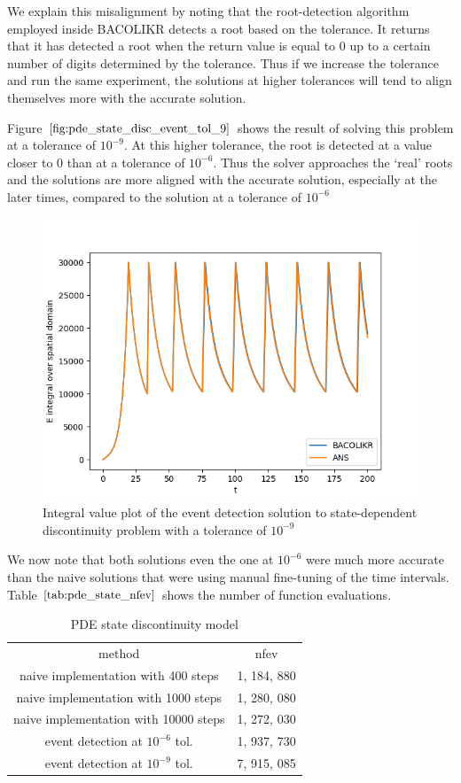 \documentclass{article}
\begin{document}
We explain this misalignment by noting that the root-detection algorithm employed inside BACOLIKR detects a root based on the tolerance. It returns that it has detected a root when the return value is equal to 0 up to a certain number of digits determined by the tolerance. Thus if we increase the tolerance and run the same experiment, the solutions at higher tolerances will tend to align themselves more with the accurate solution.

Figure $\ref{fig:pde_state_disc_event_tol_9}$ shows the result of solving this problem at a tolerance of $10^{-9}$. At this higher tolerance, the root is detected at a value closer to 0 than at a tolerance of $10^{-6}$. Thus the solver approaches the `real' roots and the solutions are more aligned with the accurate solution, especially at the later times, compared to the solution at a tolerance of $10^{-6}$


\begin{figure}[H]
\centering
\includegraphics[width=0.7\linewidth]{./figures/pde_state_disc_event_tol_9}
\caption{Integral value plot of the event detection solution to state-dependent discontinuity problem with a tolerance of $10^{-9}$}
\label{fig:pde_state_disc_event_tol_9}
\end{figure}

We now note that both solutions even the one at $10^{-6}$ were much more accurate than the naive solutions that were using manual fine-tuning of the time intervals. Table $\ref{tab:pde_state_nfev}$ shows the number of function evaluations. 

\begin{table}[h]
\caption {PDE state discontinuity model} 
\label{tab:pde_state_nfev}
\begin{center}
\begin{tabular}{ c c } 
method & nfev \\ 
naive implementation with 400 steps   & 1, 184, 880 \\
naive implementation with 1000 steps  & 1, 280, 080 \\
naive implementation with 10000 steps & 1, 272, 030 \\
event detection at $10^{-6}$ tol.     & 1, 937, 730 \\
event detection at $10^{-9}$ tol.     & 7, 915, 085 \\
\end{tabular}
\end{center}
\end{table}
\end{document}
